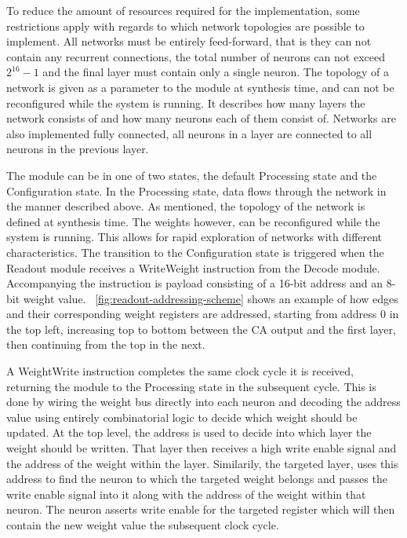 To reduce the amount of resources required for the implementation, some
restrictions apply with regards to which network topologies are possible to
implement. All networks must be entirely feed-forward, that is they can not
contain any recurrent connections, the total number of neurons can not exceed
$2^{16}-1$ and the final layer must contain only a single neuron. The topology
of a network is given as a parameter to the module at synthesis time, and can
not be reconfigured while the system is running. It describes how many layers
the network consists of and how many neurons each of them consist of. Networks
are also implemented fully connected, all neurons in a layer are connected to
all neurons in the previous layer.

The module can be in one of two states, the default Processing state and the
Configuration state. In the Processing state, data flows through the network in
the manner described above. As mentioned, the topology of the network is defined
at synthesis time. The weights however, can be reconfigured while the system is
running. This allows for rapid exploration of networks with different
characteristics. The transition to the Configuration state is triggered when the
Readout module receives a WriteWeight instruction from the Decode module.
Accompanying the instruction is payload consisting of a 16-bit address and an
8-bit weight value. \figurename~\ref{fig:readout-addressing-scheme} shows an
example of how edges and their corresponding weight registers are addressed,
starting from address 0 in the top left, increasing top to bottom between the CA
output and the first layer, then continuing from the top in the next.

A WeightWrite instruction completes the same clock cycle it is received,
returning the module to the Processing state in the subsequent cycle. This is
done by wiring the weight bus directly into each neuron and decoding the address
value using entirely combinatorial logic to decide which weight should be
updated. At the top level, the address is used to decide into which layer the
weight should be written. That layer then receives a high write enable signal
and the address of the weight within the layer. Similarily, the targeted layer,
uses this address to find the neuron to which the targeted weight belongs and
passes the write enable signal into it along with the address of the weight
within that neuron. The neuron asserts write enable for the targeted register
which will then contain the new weight value the subsequent clock cycle.

